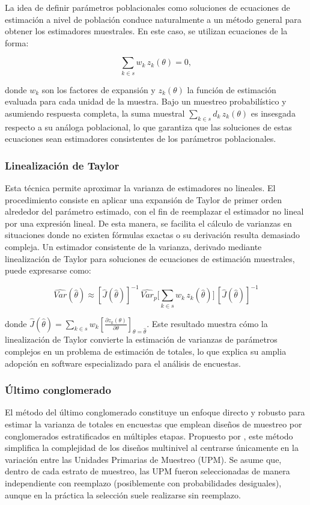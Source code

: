 \documentclass[
  spanish,
  12pt,
]{book}
\begin{document}
La idea de definir parámetros poblacionales como soluciones de ecuaciones de estimación a nivel de población conduce naturalmente a un método general para obtener los estimadores muestrales. En este caso, se utilizan ecuaciones de la forma:

\[
\sum_{k\in s} w_k\, z_k(\theta)=0,
\]

donde \(w_k\) son los factores de expansión y \(z_k(\theta)\) la función de estimación evaluada para cada unidad de la muestra. Bajo un muestreo probabilístico y asumiendo respuesta completa, la suma muestral \(\sum_{k\in s} d_k\, z_k(\theta)\) es insesgada respecto a su análoga poblacional, lo que garantiza que las soluciones de estas ecuaciones sean estimadores consistentes de los parámetros poblacionales.

\subsubsection{Linealización de Taylor}\label{linealizacion-de-taylor}

Esta técnica permite aproximar la varianza de estimadores no lineales. El procedimiento consiste en aplicar una expansión de Taylor de primer orden alrededor del parámetro estimado, con el fin de reemplazar el estimador no lineal por una expresión lineal. De esta manera, se facilita el cálculo de varianzas en situaciones donde no existen fórmulas exactas o su derivación resulta demasiado compleja. Un estimador consistente de la varianza, derivado mediante linealización de Taylor para soluciones de ecuaciones de estimación muestrales, puede expresarse como:

\[
\widehat{Var}(\hat{\theta}) \approx [\hat{J}(\hat{\theta})]^{-1} \, \widehat{Var}_p \Bigg[\sum_{k\in s} w_k\, z_k(\hat{\theta})\Bigg] \, [\hat{J}(\hat{\theta})]^{-1}
\]

donde \(\hat{J}(\hat{\theta}) = \sum_{k\in s} w_k \left[ \frac{\partial z_k(\theta)}{\partial \theta} \right]_{\theta=\hat{\theta}}\). Este resultado muestra cómo la linealización de Taylor convierte la estimación de varianzas de parámetros complejos en un problema de estimación de totales, lo que explica su amplia adopción en software especializado para el análisis de encuestas.

\subsubsection{Último conglomerado}\label{ultimo-conglomerado}

El método del último conglomerado constituye un enfoque directo y robusto para estimar la varianza de totales en encuestas que emplean diseños de muestreo por conglomerados estratificados en múltiples etapas. Propuesto por \citet{hansen1953sample}, este método simplifica la complejidad de los diseños multinivel al centrarse únicamente en la variación entre las Unidades Primarias de Muestreo (UPM). Se asume que, dentro de cada estrato de muestreo, las UPM fueron seleccionadas de manera independiente con reemplazo (posiblemente con probabilidades desiguales), aunque en la práctica la selección suele realizarse sin reemplazo.
\end{document}
